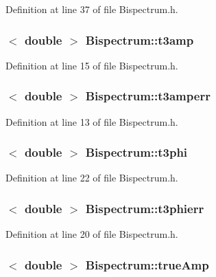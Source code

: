 Definition at line 37 of file Bispectrum.h.

\hypertarget{classBispectrum_a4f353f039c28e9a954b35efeee88803a}{
\subsubsection[{t3amp}]{$<$ double $>$ {\bf Bispectrum::t3amp}}}
\label{classBispectrum_a4f353f039c28e9a954b35efeee88803a}


Definition at line 15 of file Bispectrum.h.

\hypertarget{classBispectrum_acfb791e23ce2fe5a0d3207d600f5fced}{
\subsubsection[{t3amperr}]{$<$ double $>$ {\bf Bispectrum::t3amperr}}}
\label{classBispectrum_acfb791e23ce2fe5a0d3207d600f5fced}


Definition at line 13 of file Bispectrum.h.

\hypertarget{classBispectrum_afb0c6a5e00123a0816cdaf3f5cf99fb2}{
\subsubsection[{t3phi}]{$<$ double $>$ {\bf Bispectrum::t3phi}}}
\label{classBispectrum_afb0c6a5e00123a0816cdaf3f5cf99fb2}


Definition at line 22 of file Bispectrum.h.

\hypertarget{classBispectrum_acbda066ba007c56246f1a7dc0040e8a4}{
\subsubsection[{t3phierr}]{$<$ double $>$ {\bf Bispectrum::t3phierr}}}
\label{classBispectrum_acbda066ba007c56246f1a7dc0040e8a4}


Definition at line 20 of file Bispectrum.h.

\hypertarget{classBispectrum_a85904846b909567890fb1395b9fcb27b}{
\subsubsection[{trueAmp}]{$<$ double $>$ {\bf Bispectrum::trueAmp}}}
\label{classBispectrum_a85904846b909567890fb1395b9fcb27b}


